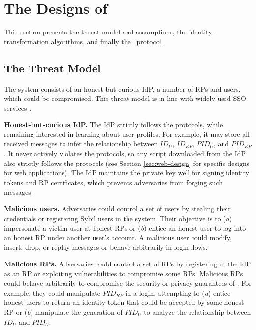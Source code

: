 \section{The Designs of \usso}
\label{sec:UPPRESSO}

This section presents the threat model and assumptions, the identity-transformation algorithms, and finally the \usso~protocol.

\subsection{The Threat Model}
\label{subsec:threatmodel}
The system consists of an honest-but-curious IdP,
 a number of RPs and users, which could be compromised. %
This threat model is in line with widely-used SSO services \cite{OpenIDConnect,rfc6749, SAML, SAMLIdentifier}.

\noindent \textbf{Honest-but-curious IdP.} The IdP strictly follows the protocols,
 while remaining interested in learning about user profiles.
For example, it may store all received messages to infer the relationship between $ID_U$, $ID_{RP}$, $PID_{U}$, and $PID_{RP}$.
It never actively violates the protocols, so any script downloaded from the IdP also strictly follows the protocols (see Section \ref{sec:web-design} for specific designs for web applications).
The IdP maintains the private key well for signing identity tokens and RP certificates, %
which prevents adversaries from forging such messages.

\noindent \textbf{Malicious users.} Adversaries could control a set of users by stealing their credentials or registering Sybil users in the system.
 Their objective is to (\emph{a}) impersonate a victim user at honest RPs or (\emph{b}) entice an honest user to log into an honest RP under another user's account.
A malicious user could modify, insert, drop, or replay messages or behave arbitrarily in login flows.

\noindent \textbf{Malicious RPs.}
Adversaries could control a set of RPs by registering at the IdP as an RP or exploiting vulnerabilities to compromise some RPs. Malicious RPs could behave arbitrarily to compromise the security or privacy guarantees of \usso.
For example, they could manipulate $PID_{RP}$ in a login, attempting to (\emph{a}) entice honest users to return an identity token that could be accepted by some honest RP or (\emph{b}) manipulate the generation of $PID_U$ to analyze the relationship between $ID_U$ and $PID_U$.

